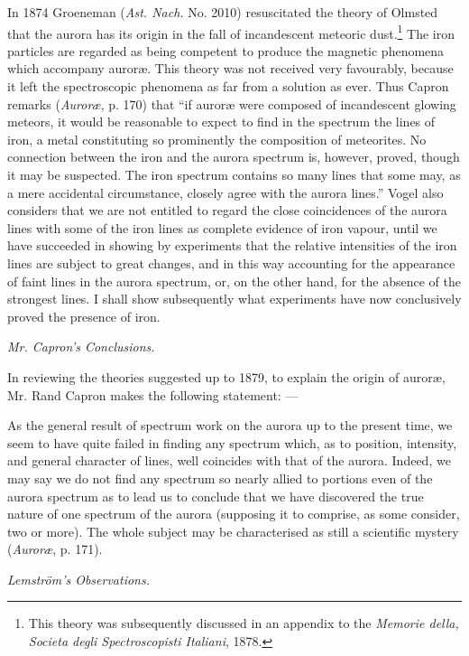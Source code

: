 \documentclass[a4paper, 12pt, oneside, polutonikogreek, english]{article}
\begin{document}
In 1874 Groeneman (\emph{Ast. Nach.} No. 2010) resuscitated the theory of Olmsted that the aurora has its origin in the fall of incandescent meteoric dust.\footnote{This theory was subsequently discussed in an appendix to the \emph{Memorie della, Societa degli Spectroscopisti Italiani}, 1878.} The iron particles are regarded as being competent to produce the magnetic phenomena which accompany auroræ. This theory was not received very favourably, because it left the spectroscopic phenomena as far from a solution as ever. Thus Capron remarks (\emph{Auroræ}, p. 170) that ``if auroræ were composed of incandescent glowing meteors, it would be reasonable to expect to find in the spectrum the lines of iron, a metal constituting so prominently the composition of meteorites. No connection between the iron and the aurora spectrum is, however, proved, though it may be suspected. The iron spectrum contains so many lines that some may, as a mere accidental circumstance, closely agree with the aurora lines.'' Vogel also considers that we are not entitled to regard the close coincidences of the aurora lines with some of the iron lines as complete evidence of iron vapour, until we have succeeded in showing by experiments that the relative intensities of the iron lines are subject to great changes, and in this way accounting for the appearance of faint lines in the aurora spectrum, or, on the other hand, for the absence of the strongest lines. I shall show subsequently what experiments have now conclusively proved the presence of iron.

\emph{Mr. Capron's Conclusions.}

In reviewing the theories suggested up to 1879, to explain the origin of auroræ, Mr. Rand Capron makes the following statement: ---

As the general result of spectrum work on the aurora up to the present time, we seem to have quite failed in finding any spectrum which, as to position, intensity, and general character of lines, well coincides with that of the aurora. Indeed, we may say we do not find any spectrum so nearly allied to portions even of the aurora spectrum as to lead us to conclude that we have discovered the true nature of one spectrum of the aurora (supposing it to comprise, as some consider, two or more). The whole subject may be characterised as still a scientific mystery (\emph{Auroræ}, p. 171).

\emph{Lemström's Observations.}
\end{document}
